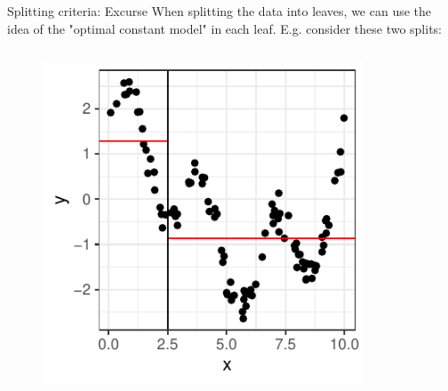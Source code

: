 \documentclass[11pt,compress,t,notes=noshow, xcolor=table]{beamer}
\begin{document}
\begin{vbframe}{Splitting criteria: Excurse}
When splitting the data into leaves, we can use the idea of the "optimal constant model" in each leaf. E.g. consider these two splits:

\begin{columns}
\begin{column}{0.5\textwidth}

\color{fgcolor}

\begin{figure}
\includegraphics[width=0.9\textwidth]{figure/splitcrit_optimal-constant-sub1.pdf} 
\end{figure}

 
\end{column}
\begin{column}{0.5\textwidth}


\end{column}
\end{columns}
\end{vbframe}
\end{document}
